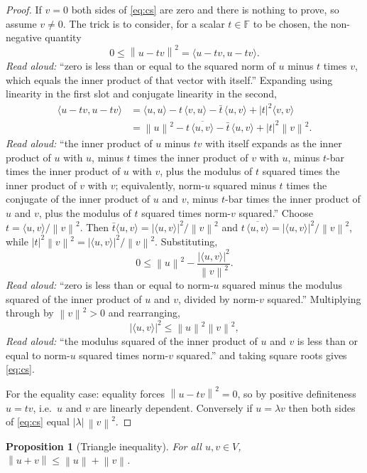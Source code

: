 \documentclass[11pt]{article}
\newtheorem{proposition}[theorem]{Proposition}
\theoremstyle{definition}
\newcommand{\inner}[2]{\langle #1, #2 \rangle}
\newcommand{\norm}[1]{\left\| #1 \right\|}
\newcommand{\F}{\mathbb{F}}
\begin{document}
\begin{proof}
If $v = 0$ both sides of \eqref{eq:cs} are zero and there is nothing
to prove, so assume $v \neq 0$. The trick is to consider, for a scalar
$t \in \F$ to be chosen, the non-negative quantity
$$0 \le \norm{u - t v}^2 = \inner{u - t v}{u - t v}.$$
\emph{Read aloud:} ``zero is less than or equal to the squared norm of $u$ minus $t$ times $v$, which equals the inner product of that vector with itself.''
Expanding using linearity in the first slot and conjugate linearity in
the second,
\begin{align*}
\inner{u - tv}{u - tv}
  &= \inner{u}{u} - t\,\inner{v}{u} - \bar t\,\inner{u}{v} + |t|^2 \inner{v}{v} \\
  &= \norm{u}^2 - t\,\overline{\inner{u}{v}} - \bar t\,\inner{u}{v}
     + |t|^2 \norm{v}^2.
\end{align*}
\emph{Read aloud:} ``the inner product of $u$ minus $tv$ with itself expands as the inner product of $u$ with $u$, minus $t$ times the inner product of $v$ with $u$, minus $t$-bar times the inner product of $u$ with $v$, plus the modulus of $t$ squared times the inner product of $v$ with $v$; equivalently, norm-$u$ squared minus $t$ times the conjugate of the inner product of $u$ and $v$, minus $t$-bar times the inner product of $u$ and $v$, plus the modulus of $t$ squared times norm-$v$ squared.''
Choose $t = \inner{u}{v} / \norm{v}^2$. Then $\bar t \inner{u}{v} =
|\inner{u}{v}|^2 / \norm{v}^2$ and $t\,\overline{\inner{u}{v}} =
|\inner{u}{v}|^2 / \norm{v}^2$, while $|t|^2 \norm{v}^2 =
|\inner{u}{v}|^2 / \norm{v}^2$. Substituting,
$$0 \le \norm{u}^2 - \frac{|\inner{u}{v}|^2}{\norm{v}^2}.$$
\emph{Read aloud:} ``zero is less than or equal to norm-$u$ squared minus the modulus squared of the inner product of $u$ and $v$, divided by norm-$v$ squared.''
Multiplying through by $\norm{v}^2 > 0$ and rearranging,
$$|\inner{u}{v}|^2 \le \norm{u}^2 \norm{v}^2,$$
\emph{Read aloud:} ``the modulus squared of the inner product of $u$ and $v$ is less than or equal to norm-$u$ squared times norm-$v$ squared.''
and taking square roots gives \eqref{eq:cs}.

For the equality case: equality forces $\norm{u - t v}^2 = 0$, so by
positive definiteness $u = tv$, i.e.\ $u$ and $v$ are linearly
dependent. Conversely if $u = \lambda v$ then both sides of
\eqref{eq:cs} equal $|\lambda|\,\norm{v}^2$.
\end{proof}

\begin{proposition}[Triangle inequality]
For all $u, v \in V$, $\norm{u + v} \le \norm{u} + \norm{v}$.
\end{proposition}
\end{document}
